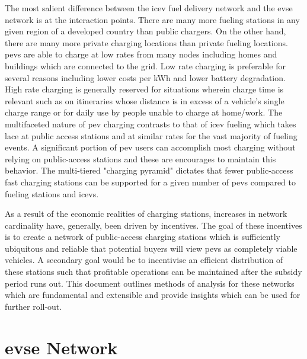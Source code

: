 \documentclass[12pt]{article}
\begin{document}
The most salient difference between the \gls{icev} fuel delivery network and the \gls{evse} network is at the interaction points. There are many more fueling stations in any given region of a developed country than public chargers. On the other hand, there are many more private charging locations than private fueling locations. \glspl{pev} are able to charge at low rates from many nodes including homes and buildings which are connected to the grid. Low rate charging is preferable for several reasons including lower costs per kWh and lower battery degradation. High rate charging is generally reserved for situations wherein charge time is relevant such as on itineraries whose distance is in excess of a vehicle's single charge range or for daily use by people unable to charge at home/work. The multifaceted nature of \gls{pev} charging contrasts to that of \gls{icev} fueling which takes lace at public access stations and at similar rates for the vast majority of fueling events. A significant portion of \gls{pev} users can accomplish most charging without relying on public-access stations and these are encourages to maintain this behavior. The multi-tiered "charging pyramid" dictates that fewer public-access fast charging stations can be supported for a given number of \glspl{pev} compared to fueling stations and \glspl{icev}.

As a result of the economic realities of charging stations, increases in network cardinality have, generally, been driven by incentives. The goal of these incentives is to create a network of public-access charging stations which is sufficiently ubiquitous and reliable that potential buyers will view \glspl{pev} as completely viable vehicles. A secondary goal would be to incentivise an efficient distribution of these stations such that profitable operations can be maintained after the subsidy period runs out. This document outlines methods of analysis for these networks which are fundamental and extensible and provide insights which can be used for further roll-out.

\section*{\gls{evse} Network}
\end{document}
